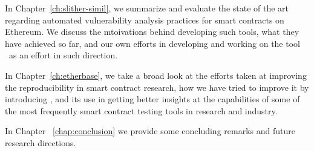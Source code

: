   In Chapter~\ref{ch:slither-simil}, we summarize and evaluate the state of the art regarding automated vulnerability analysis practices for smart contracts on Ethereum.
  We discuss the mtoivations behind developing such tools, what they have achieved so far, and our own efforts in developing and working on the tool \slithersimil~as an effort in such direction.

  In Chapter~\ref{ch:etherbase}, we take a broad look at the efforts taken at improving the reproducibility in smart contract research, how we have tried to improve it by introducing \etherbase, and its use in getting better insights at the capabilities of some of the most frequently smart contract testing tools in research and industry.

  In Chapter ~\ref{chap:conclusion} we provide some concluding remarks and future research directions.